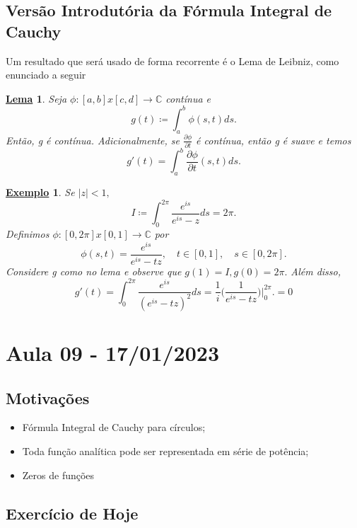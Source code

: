\documentclass{article}
\newtheorem{example}{\underline{Exemplo}}[section]
\newtheorem*{lmm*}{\underline{Lema}}
\begin{document}
  \subsection{Vers\~ao Introdut\'oria da F\'ormula Integral de Cauchy}
  Um resultado que ser\'a usado de forma recorrente \'e o Lema de Leibniz, como enunciado a seguir
  \begin{lmm*}
    Seja $\phi:[a, b]x[c, d]\rightarrow \mathbb{C}$ cont\'inua e 
    $$
    g(t)\coloneqq  \int_{a}^{b}\phi(s, t)ds.
    $$
    Ent\~ao, g \'e cont\'inua. Adicionalmente, se $\frac{\partial{\phi}}{\partial{t}}$ \'e cont\'inua, ent\~ao g \'e suave e temos
    $$
    g'(t) = \int_{a}^{b}\frac{\partial{\phi}}{\partial{t}}(s, t)ds.
    $$
  \end{lmm*}
  \begin{example}
    Se $|z| < 1,$
    $$
    I\coloneqq  \int_{0}^{2\pi}\frac{e^{is}}{e^{is}-z}ds = 2\pi.
    $$
    Definimos $\phi:[0, 2\pi]x[0, 1]\rightarrow \mathbb{C}$ por 
    $$
    \phi(s, t) = \frac{e^{is}}{e^{is} - tz}, \quad t\in[0, 1], \quad s\in[0, 2\pi].
    $$
    Considere g como no lema e observe que $g(1) = I, g(0) = 2\pi.$ Al\'em disso,
    $$
    g'(t) = \int_{0}^{2\pi}\frac{e^{is}}{(e^{is} - tz)^{2}}ds = \frac{1}{i}\biggl(\frac{1}{e^{is}-tz}\biggr)\biggl|_0^{2\pi}\biggr. = 0
    $$
  \end{example}
  \newpage

  \section{Aula 09 - 17/01/2023}
  \subsection{Motiva\c c\~oes}
  \begin{itemize}
    \item F\'ormula Integral de Cauchy para c\'irculos;
    \item Toda fun\c c\~ao anal\'itica pode ser representada em s\'erie de pot\^encia;
    \item Zeros de fun\c c\~oes
  \end{itemize}
  \subsection{Exerc\'icio de Hoje}
\end{document}
